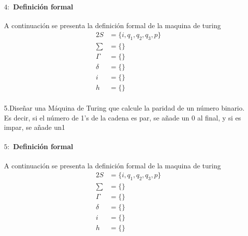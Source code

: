 \documentclass[10pt,a4paper]{book}
\begin{document}
{\paragraph{$4:$ Definición formal}A continuación se presenta la definición formal de la maquina de turing\\[0.2cm]
\begin{alignat*}{2}
	S&= \{i, q_1, q_2, q_3, p\}\\
	\textstyle \sum&= \{\}\\
	\Gamma&=\{\}\\
	\delta&=\{\}\\
	i&=\{\}\\
	h&=\{\}
\end{alignat*}
\newpage

\paragraph{}5.Diseñar una Máquina de Turing que calcule la paridad de un número binario. Es decir, si el número de 1’s de la cadena es par, se añade un 0 al final, y si es impar, se añade un1\\[1cm]
\begin{figure*}[ht!]
	\centering
\end{figure*}
\paragraph{$5:$ Definición formal}A continuación se presenta la definición formal de la maquina de turing\\[0.2cm]
\begin{alignat*}{2}
	S&= \{i, q_1, q_2, q_3, p\}\\
	\textstyle \sum&= \{\}\\
	\Gamma&=\{\}\\
	\delta&=\{\}\\
	i&=\{\}\\
	h&=\{\}
\end{alignat*}
}
\end{document}
